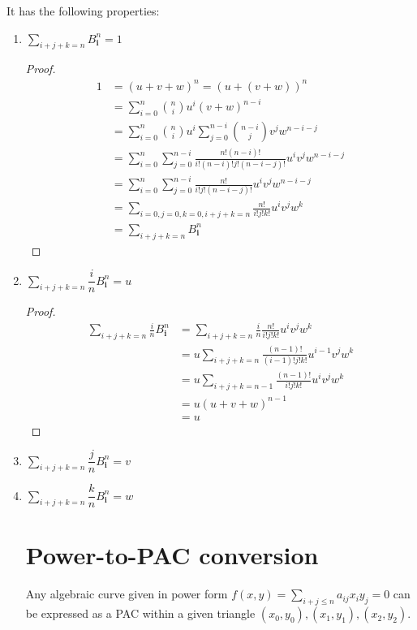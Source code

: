 \documentclass[reqno]{amsart}
\theoremstyle{plain}
\begin{document}
 It has the following properties:
 \begin{enumerate}
 \item $\sum_{i+j+k=n}B_{\mathbf{i}}^{n} = 1$

 \begin{proof}
    \begin{align*}
    1 &= (u+v+w)^{n} = (u+(v+w))^{n} \\
    &= \sum_{i=0}^{n}\binom{n}{i}u^{i}(v+w)^{n-i} \\
    &=
    \sum_{i=0}^{n}\binom{n}{i}u^{i}\sum_{j=0}^{n-i}\binom{n-i}{j}v^{j}w^{n-i-j}
    \\
    &=\sum_{i=0}^{n}\sum_{j=0}^{n-i}\frac{n!(n-i)!}{i!(n-i)!j!(n-i-j)!}u^{i}v^{j}w^{n-i-j}
    \\
    &=\sum_{i=0}^{n}\sum_{j=0}^{n-i}\frac{n!}{i!j!(n-i-j)!}u^{i}v^{j}w^{n-i-j}\\
    &=\sum_{i=0,j=0,k=0,i+j+k=n}\frac{n!}{i!j!k!}u^{i}v^{j}w^{k}
    \\
    &= \sum_{i+j+k=n}B_{\mathbf{i}}^{n}
    \end{align*}
\end{proof}

 \item $\sum_{i+j+k=n}\dfrac{i}{n}B_{\mathbf{i}}^{n} = u$ \\
 \begin{proof}
 \begin{align*}
   \sum_{i+j+k=n}\frac{i}{n}B_{\mathbf{i}}^{n}
    &=\sum_{i+j+k=n}\frac{i}{n}\frac{n!}{i!j!k!}u^{i}v^{j}w^{k} \\
    &=u\sum_{i+j+k=n}\frac{(n-1)!}{(i-1)!j!k!}u^{i-1}v^{j}w^{k} \\
    &= u\sum_{i+j+k=n-1}\frac{(n-1)!}{i!j!k!}u^{i}v^{j}w^{k} \\
    &=u(u+v+w)^{n-1} \\
    &=u
 \end{align*}
\end{proof}

 \item $\sum_{i+j+k=n}\dfrac{j}{n}B_{\mathbf{i}}^{n} = v$

 \item $\sum_{i+j+k=n}\dfrac{k}{n}B_{\mathbf{i}}^{n} = w$

\section{Power-to-PAC conversion}\label{S:con}
Any algebraic curve given in power form $f(x,y)=\sum_{i+j\leq
n}a_{ij}x_{i}y_{j}=0$ can be expressed as a PAC within a given
triangle $(x_{0},y_{0}),(x_{1},y_{1}),(x_{2},y_{2})$.


\end{enumerate}
\end{document}
